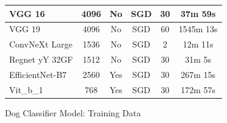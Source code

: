 \documentclass{article}
\begin{document}
\begin{figure}[h]
\begin{tabular}{|l|c|c|c|c|c|}
VGG 16                               & 4096                                                                                            & No                                                                            & SGD                & 30                                                                          & 37m 59s                                                           \\ \hline
VGG 19                               & 4096                                                                                            & No                                                                            & SGD                & 60                                                                          & 1545m 13s                                                         \\ \hline
ConvNeXt Large                       & 1536                                                                                            & No                                                                            & SGD                & 2                                                                           & 12m 11s                                                           \\ \hline
Regnet yY 32GF                       & 1512                                                                                            & No                                                                            & SGD                & 30                                                                          & 31m 5s                                                            \\ \hline
EfficientNet-B7                      & 2560                                                                                            & Yes                                                                           & SGD                & 30                                                                          & 267m 15s                                                          \\ \hline
Vit\_b\_1                            & 768                                                                                             & Yes                                                                           & SGD                & 30                                                                          & 172m 57s                                                          \\ \hline
\end{tabular}
\caption{Dog Classifier Model: Training Data}
\label{fig:model2-train}
\end{figure}
\end{document}
